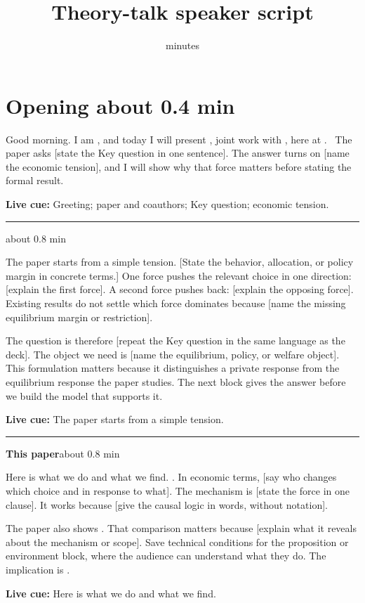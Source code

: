 \documentclass[11pt]{article}
\title{Theory-talk speaker script\\[0.25em]\large \PaperTitle}
\author{\PaperAuthors}
\date{\VenueDate\quad [total session] minutes}
\newcommand{\Cue}[1]{\par\nobreak\smallskip\noindent
  \textcolor{ScriptGray}{\footnotesize\textbf{Live cue:} #1}\par}
\newcommand{\scriptopening}[2]{%
  \Needspace{10\baselineskip}%
  \section*{Opening \hfill\normalfont\small\textcolor{ScriptGray}{#1}}
  #2\par}
\newcommand{\scriptframe}[3]{%
  \Needspace{9\baselineskip}%
  \par\medskip\noindent\textcolor{ScriptBlue}{\rule{\linewidth}{0.55pt}}%
  \par\smallskip\noindent
  \textbf{#1}\hfill\textcolor{ScriptGray}{\small #2}\par\smallskip
  #3\par}
\begin{document}
\maketitle
\thispagestyle{fancy}

\scriptopening{about 0.4 min}{%
  Good morning. I am \PresenterName, and today I will present
  \emph{\PaperTitle}, joint work with \CoauthorsSpoken, here at \VenueShort.
  \TitleDisclaimer\ The paper asks [state the Key question in one sentence].
  The answer turns on [name the economic tension], and I will show why that
  force matters before stating the formal result.
  \Cue{Greeting; paper and coauthors; Key question; economic tension.}
}

\scriptframe{\KeyQuestion}{about 0.8 min}{%
  The paper starts from a simple tension. [State the behavior, allocation, or
  policy margin in concrete terms.] One force pushes the relevant choice in
  one direction: [explain the first force]. A second force pushes back:
  [explain the opposing force]. Existing results do not settle which force
  dominates because [name the missing equilibrium margin or restriction].

  The question is therefore [repeat the Key question in the same language as
  the deck]. The object we need is [name the equilibrium, policy, or welfare
  object]. This formulation matters because it distinguishes a private
  response from the equilibrium response the paper studies. The next block
  gives the answer before we build the model that supports it.
  \Cue{The paper starts from a simple tension.}
}

\scriptframe{This paper}{about 0.8 min}{%
  Here is what we do and what we find. \ResultHeadlineSpoken. In economic terms, [say who
  changes which choice and in response to what]. The mechanism is [state the
  force in one clause]. It works because [give the causal logic in words,
  without notation].

  The paper also shows \ResultSupportSpoken. That comparison matters because
  [explain what it reveals about the mechanism or scope]. Save technical
  conditions for the proposition or environment block, where the audience can
  understand what they do. The implication is \ResultImplicationSpoken.
  \Cue{Here is what we do and what we find.}
}
\end{document}
